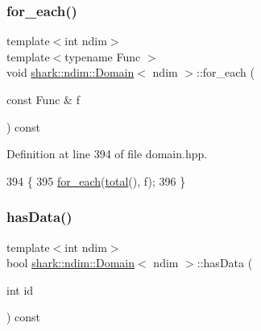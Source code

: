 \hypertarget{classshark_1_1ndim_1_1_domain_ad27f4f2dfd613d8c50e0d29ff93bb8e6}{}\label{classshark_1_1ndim_1_1_domain_ad27f4f2dfd613d8c50e0d29ff93bb8e6} 
\subsubsection{\texorpdfstring{for\+\_\+each()}{for\_each()}\hspace{0.1cm}{\footnotesize\ttfamily [3/3]}}
{\footnotesize\ttfamily template$<$int ndim$>$ \\
template$<$typename Func $>$ \\
void \hyperlink{classshark_1_1ndim_1_1_domain}{shark\+::ndim\+::\+Domain}$<$ ndim $>$\+::for\+\_\+each (\begin{DoxyParamCaption}\item[{const Func \&}]{f }\end{DoxyParamCaption}) const\hspace{0.3cm}{\ttfamily [inline]}}



Definition at line 394 of file domain.\+hpp.


\begin{DoxyCode}
394                                                               \{
395             \hyperlink{classshark_1_1ndim_1_1_domain_aa234c8c238090b7dd05f9df07c39f223}{for\_each}(\hyperlink{classshark_1_1ndim_1_1_domain_ae4357c99519b3efbaf2544828629de87}{total}(), f);
396         \}
\end{DoxyCode}
\hypertarget{classshark_1_1ndim_1_1_domain_a9ab20d9ecd3ca2c046ee253a30ab843f}{}\label{classshark_1_1ndim_1_1_domain_a9ab20d9ecd3ca2c046ee253a30ab843f} 
\subsubsection{\texorpdfstring{has\+Data()}{hasData()}\hspace{0.1cm}{\footnotesize\ttfamily [1/2]}}
{\footnotesize\ttfamily template$<$int ndim$>$ \\
bool \hyperlink{classshark_1_1ndim_1_1_domain}{shark\+::ndim\+::\+Domain}$<$ ndim $>$\+::has\+Data (\begin{DoxyParamCaption}\item[{int}]{id }\end{DoxyParamCaption}) const\hspace{0.3cm}{\ttfamily [inline]}}

